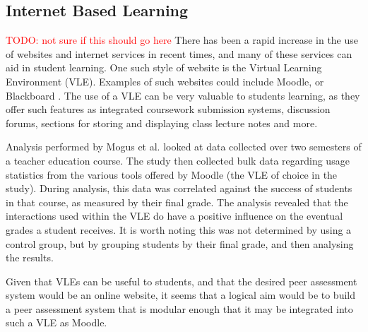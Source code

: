 \documentclass[a4paper,11pt]{report}
\newcommand{\todo}[1]{\textcolor{red}{TODO: #1}}
\begin{document}
\subsection{Internet Based Learning}
\todo{not sure if this should go here}
There has been a rapid increase in the use of websites and internet services in recent times, and many of these services can aid in student learning. One such style of website is the Virtual Learning Environment (VLE). Examples of such websites could include Moodle, \cite{moodle_about_2016} or Blackboard \cite{blackboard_blackboard_2016}. The use of a VLE can be very valuable to students learning, as they offer such features as integrated coursework submission systems, discussion forums, sections for storing and displaying class lecture notes and more.\par
Analysis performed by Mogus et al. \cite{mogus_impact_2012} looked at data collected over two semesters of a teacher education course. The study then collected bulk data regarding usage statistics from the various tools offered by Moodle (the VLE of choice in the study). During analysis, this data was correlated against the success of students in that course, as measured by their final grade. The analysis 
revealed that the interactions used within the VLE do have a positive influence on the eventual grades a student receives. It is worth noting this was not determined by using a control group, but by grouping students by their final grade, and then analysing the results.\par
Given that VLEs can be useful to students, and that the desired peer assessment system would be an online website, it seems that a logical aim would be to build a peer assessment system that is modular enough that it may be integrated into such a VLE as Moodle.
\end{document}
